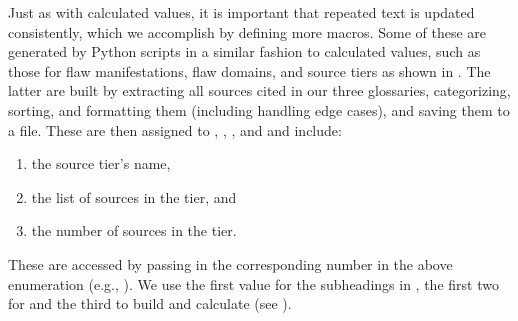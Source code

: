 \label{text-macros}
Just as with calculated values, it is important that repeated text is updated
consistently, which we accomplish by defining more macros. Some of these are
generated by Python scripts in a similar fashion to calculated values, such as
those for flaw manifestations, flaw domains, and source tiers as shown in
. The latter are built by extracting all
sources cited in our three glossaries, categorizing, sorting, and formatting
them (including handling edge cases), and saving them to a file. These are then
assigned to , , , and
 and include:
\begin{enumerate}
    \item the source tier's name,
    \item the list of sources in the tier, and
    \item the number of sources in the tier.
\end{enumerate}
These are accessed by passing in the corresponding number in the above
enumeration (e.g., ). We use the first value for the
subheadings in , the first two for  and
the third to build  and calculate 
(see ).


\begin{landscape}
    
\end{landscape}
% 

